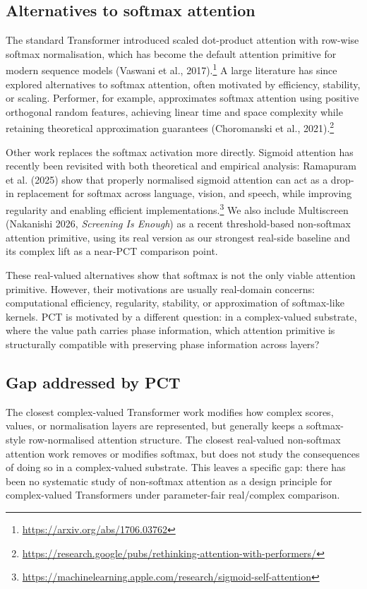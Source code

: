 \documentclass[11pt,a4paper]{article}
\theoremstyle{plain}
\theoremstyle{definition}
\begin{document}
\subsection{Alternatives to softmax attention}
The standard Transformer introduced scaled dot-product attention with row-wise softmax normalisation, which has become the default attention primitive for modern sequence models (Vaswani et al., 2017).\footnote{\url{https://arxiv.org/abs/1706.03762}} A large literature has since explored alternatives to softmax attention, often motivated by efficiency, stability, or scaling. Performer, for example, approximates softmax attention using positive orthogonal random features, achieving linear time and space complexity while retaining theoretical approximation guarantees (Choromanski et al., 2021).\footnote{\url{https://research.google/pubs/rethinking-attention-with-performers/}}

Other work replaces the softmax activation more directly. Sigmoid attention has recently been revisited with both theoretical and empirical analysis: Ramapuram et al. (2025) show that properly normalised sigmoid attention can act as a drop-in replacement for softmax across language, vision, and speech, while improving regularity and enabling efficient implementations.\footnote{\url{https://machinelearning.apple.com/research/sigmoid-self-attention}} We also include Multiscreen (Nakanishi 2026, \emph{Screening Is Enough}) as a recent threshold-based non-softmax attention primitive, using its real version as our strongest real-side baseline and its complex lift as a near-PCT comparison point.

These real-valued alternatives show that softmax is not the only viable attention primitive. However, their motivations are usually real-domain concerns: computational efficiency, regularity, stability, or approximation of softmax-like kernels. PCT is motivated by a different question: in a complex-valued substrate, where the value path carries phase information, which attention primitive is structurally compatible with preserving phase information across layers?

\subsection{Gap addressed by PCT}
The closest complex-valued Transformer work modifies how complex scores, values, or normalisation layers are represented, but generally keeps a softmax-style row-normalised attention structure. The closest real-valued non-softmax attention work removes or modifies softmax, but does not study the consequences of doing so in a complex-valued substrate. This leaves a specific gap: there has been no systematic study of non-softmax attention as a design principle for complex-valued Transformers under parameter-fair real/complex comparison.
\end{document}
